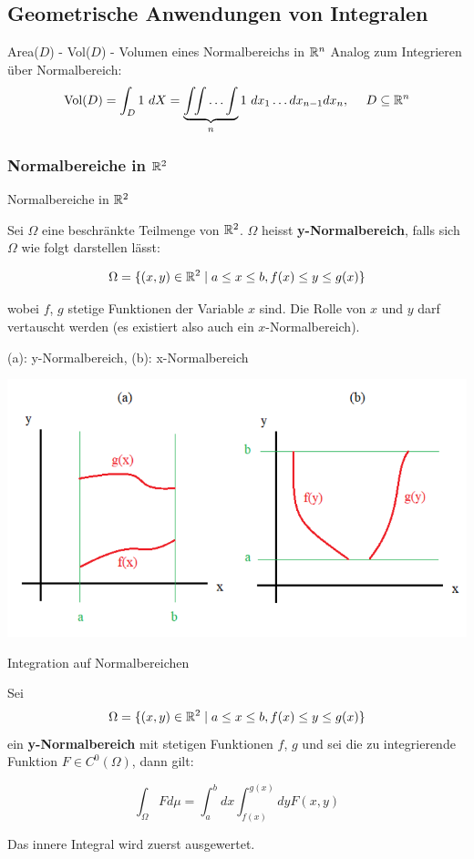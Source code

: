 
\subsection{Geometrische Anwendungen von Integralen}

\begin{Rezept}{Area($D$) - Vol($D$) - Volumen eines Normalbereichs in $\mathbb{R}^n$}{}
Analog zum Integrieren über Normalbereich:
\[ \text{Vol}(D) = \int_D 1 ~ dX = \underbrace{\int \!\! \int \ldots \int}_{n} 1 ~ dx_1 \ldots dx_{n-1} dx_n,  ~~~~ D \subseteq \mathbb{R}^n\]
\end{Rezept}

\subsubsection{Normalbereiche in $\mathbb{R}^2$}

\begin{Definition}{Normalbereiche in $\mathbb{R}^2$}{}
\begin{minipage}{.65\textwidth}
Sei $\Omega$ eine beschränkte Teilmenge von $\mathbb{R}^2$. $\Omega$ heisst \textbf{y-Normalbereich}, falls sich $\Omega$ wie folgt darstellen lässt:

\[
    \Omega = \{(x, y) \in \mathbb{R}^2 \mid a \leq x \leq b, f(x) \leq y \leq g(x)\}
\]

wobei $f$, $g$ stetige Funktionen der Variable $x$ sind. Die Rolle von $x$ und $y$ darf vertauscht werden (es existiert also auch ein $x$-Normalbereich).

(a): y-Normalbereich, (b): x-Normalbereich
\end{minipage}%
\begin{minipage}{.35\textwidth}
  \includegraphics[width=\textwidth]{images/normalbereich}
\end{minipage}

\end{Definition}
\begin{Satz}{Integration auf Normalbereichen}{}

Sei \[\Omega = \{(x, y) \in \mathbb{R}^2 \mid a \leq x \leq b, f(x) \leq y \leq g(x)\}\] ein \textbf{y-Normalbereich} mit stetigen Funktionen $f$, $g$ und sei die zu integrierende Funktion $F \in C^0(\Omega)$, dann gilt:

\[
    \int_{\Omega} F d\mu = \int_a^b dx \int_{f(x)}^{g(x)} dy F(x, y)
\]

Das innere Integral wird zuerst ausgewertet.
\end{Satz}

